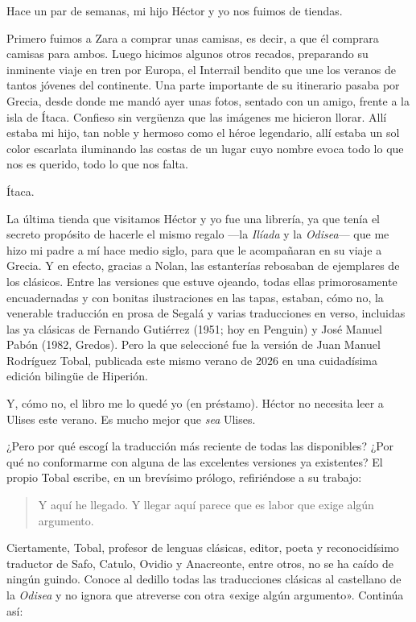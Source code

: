 \label{cap:osada}

Hace un par de semanas, mi hijo Héctor y yo nos fuimos de tiendas.

Primero fuimos a Zara a comprar unas camisas, es decir, a que él comprara camisas para ambos. Luego hicimos algunos otros recados, preparando su inminente viaje en tren por Europa, el Interrail bendito que une los veranos de tantos jóvenes del continente. Una parte importante de su itinerario pasaba por Grecia, desde donde me mandó ayer unas fotos, sentado con un amigo, frente a la isla de Ítaca. Confieso sin vergüenza que las imágenes me hicieron llorar. Allí estaba mi hijo, tan noble y hermoso como el héroe legendario, allí estaba un sol color escarlata iluminando las costas de un lugar cuyo nombre evoca todo lo que nos es querido, todo lo que nos falta.

Ítaca.

La última tienda que visitamos Héctor y yo fue una librería, ya que tenía el secreto propósito de hacerle el mismo regalo ---la \emph{Ilíada} y la \emph{Odisea}--- que me hizo mi padre a mí hace medio siglo, para que le acompañaran en su viaje a Grecia. Y en efecto, gracias a Nolan, las estanterías rebosaban de ejemplares de los clásicos. Entre las versiones que estuve ojeando, todas ellas primorosamente encuadernadas y con bonitas ilustraciones en las tapas, estaban, cómo no, la venerable traducción en prosa de Segalá y varias traducciones en verso, incluidas las ya clásicas de Fernando Gutiérrez (1951; hoy en Penguin) y José Manuel Pabón (1982, Gredos). Pero la que seleccioné fue la versión de Juan Manuel Rodríguez Tobal, publicada este mismo verano de 2026 en una cuidadísima edición bilingüe de Hiperión.

Y, cómo no, el libro me lo quedé yo (en préstamo). Héctor no necesita leer a Ulises este verano. Es mucho mejor que \emph{sea} Ulises.

¿Pero por qué escogí la traducción más reciente de todas las disponibles? ¿Por qué no conformarme con alguna de las excelentes versiones ya existentes?
El propio Tobal escribe, en un brevísimo prólogo, refiriéndose a su trabajo:

\begin{quotation}
Y aquí he llegado. Y llegar aquí parece que es labor que exige algún argumento.
\end{quotation}

Ciertamente, Tobal, profesor de lenguas clásicas, editor, poeta y reconocidísimo traductor de Safo, Catulo, Ovidio y Anacreonte, entre otros, no se ha caído de ningún guindo. Conoce al dedillo todas las traducciones clásicas al castellano de la \emph{Odisea} y no ignora que atreverse con otra «exige algún argumento». Continúa así:

